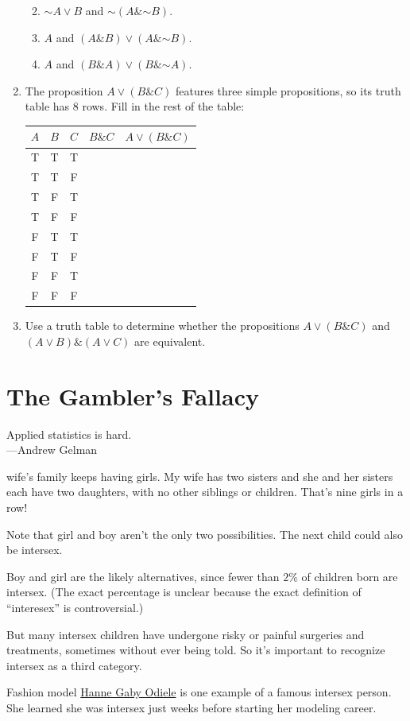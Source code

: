 \documentclass[justified]{tufte-book}
\providecommand{\tightlist}{%
  \setlength{\itemsep}{0pt}\setlength{\parskip}{0pt}}
\renewcommand{\neg}{\mathbin{\sim}}
\renewcommand{\wedge}{\mathbin{\&}}
\newenvironment{epigraph}%
{
\begin{flushright}    
\begin{minipage}{20em}
\begin{flushright}
\itshape
}%
{
\end{flushright}
\end{minipage}
\end{flushright}
}
\theoremstyle{definition}
\theoremstyle{definition}
\theoremstyle{definition}
\theoremstyle{remark}
\begin{document}
\begin{enumerate}
  \begin{enumerate}
  \def\labelenumii{\alph{enumii}.}
  \tightlist
  \item
    \(\neg A \vee B\) and \(\neg (A \wedge \neg B)\).
  \item
    \(A\) and \((A \wedge B) \vee (A \wedge \neg B)\).
  \item
    \(A\) and \((B \wedge A) \vee (B \wedge \neg A)\).
  \end{enumerate}
\item
  The proposition \(A \vee (B \wedge C)\) features three simple
  propositions, so its truth table has 8 rows. Fill in the rest of the
  table:

  \begin{longtable}[]{@{}ccccc@{}}
  \toprule
  \(A\) & \(B\) & \(C\) & \(B \wedge C\) &
  \(A \vee (B \wedge C)\)\tabularnewline
  \midrule
  \endhead
  T & T & T & &\tabularnewline
  T & T & F & &\tabularnewline
  T & F & T & &\tabularnewline
  T & F & F & &\tabularnewline
  F & T & T & &\tabularnewline
  F & T & F & &\tabularnewline
  F & F & T & &\tabularnewline
  F & F & F & &\tabularnewline
  \bottomrule
  \end{longtable}
\item
  Use a truth table to determine whether the propositions
  \(A \vee (B \wedge C)\) and \((A \vee B) \wedge (A \vee C)\) are
  equivalent.
\end{enumerate}

\hypertarget{the-gamblers-fallacy}{%
\chapter{The Gambler's Fallacy}\label{the-gamblers-fallacy}}

\begin{epigraph}
Applied statistics is hard.\\
---Andrew Gelman
\end{epigraph}

 wife's family keeps having girls. My wife has two
sisters and she and her sisters each have two daughters, with no other
siblings or children. That's nine girls in a row!

\begin{marginfigure}
Note that girl and boy aren't the only two possibilities. The next child
could also be intersex.

Boy and girl are the likely alternatives, since fewer than \(2\%\) of
children born are intersex. (The exact percentage is unclear because the
exact definition of ``interesex'' is controversial.)

But many intersex children have undergone risky or painful surgeries and
treatments, sometimes without ever being told. So it's important to
recognize intersex as a third category.

Fashion model
\href{https://en.wikipedia.org/wiki/Hanne_Gaby_Odiele}{Hanne Gaby
Odiele} is one example of a famous intersex person. She learned she was
intersex just weeks before starting her modeling career.
\end{marginfigure}
\end{document}
